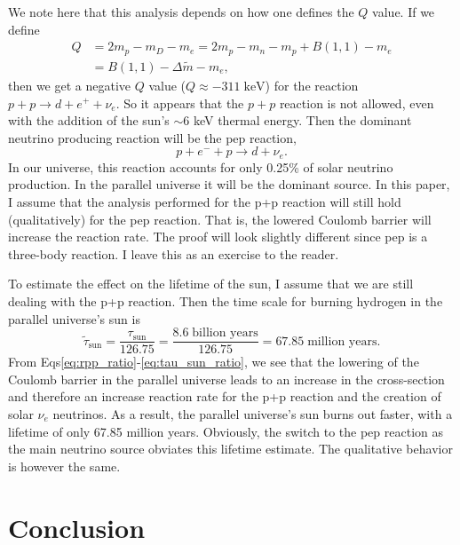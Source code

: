 \documentclass[%
 reprint,
 amsmath,amssymb,
 aps,
]{revtex4-1}
\begin{document}
We note here that this analysis depends on how one defines the $Q$ value. If we define
\begin{align}
	Q &= 2 m_p - m_D - m_e = 2 m_p - m_n - m_p + B(1, 1) - m_e \\
	&= B(1, 1) - \Delta \widetilde{m} - m_e,
\end{align}
then we get a negative $Q$ value ($Q \approx - 311 \; \text{keV}$) for the reaction $p + p \rightarrow d + e^+ + \nu_e$. So it appears that the $p+p$ reaction is not allowed, even with the addition of the sun's $\sim 6$ keV thermal energy. Then the dominant neutrino producing reaction will be the pep reaction,
\begin{equation}
	p + e^- + p \rightarrow d + \nu_e.
\end{equation}
In our universe, this reaction accounts for only 0.25\% of solar neutrino production. In the parallel universe it will be the dominant source. In this paper, I assume that the analysis performed for the p+p reaction will still hold (qualitatively) for the pep reaction. That is, the lowered Coulomb barrier will increase the reaction rate. The proof will look slightly different since pep is a three-body reaction. I leave this as an exercise to the reader.

To estimate the effect on the lifetime of the sun, I assume that we are still dealing with the p+p reaction. Then the time scale for burning hydrogen in the parallel universe's sun is\cite{HaxtonLectureNotes}
\begin{equation}
    \widetilde{\tau}_\text{sun} = \frac{\tau_\text{sun}}{126.75}
    = \frac{8.6 \; \text{billion years}}{126.75}
    = 67.85 \; \text{million years}.
    \label{eq:tau_sun_ratio}
\end{equation}
From Eqs\eqref{eq:rpp_ratio}-\eqref{eq:tau_sun_ratio}, we see that the lowering of the Coulomb barrier in the parallel universe leads to an increase in the cross-section and therefore an increase reaction rate for the p+p reaction and the creation of solar $\nu_e$ neutrinos. As a result, the parallel universe's sun burns out faster, with a lifetime of only 67.85 million years. Obviously, the switch to the pep reaction as the main neutrino source obviates this lifetime estimate. The qualitative behavior is however the same.

\section{\label{sec:conclusion}Conclusion}
\end{document}
